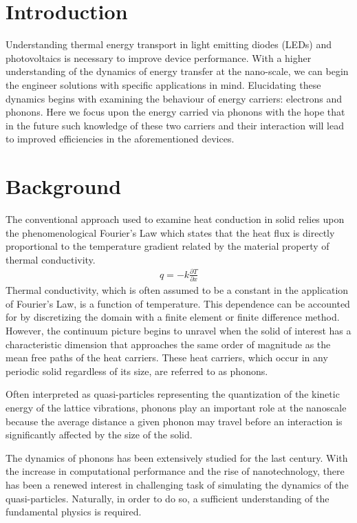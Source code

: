 \documentclass{article}
\numberwithin{equation}{section}
\begin{document}
\section{Introduction}
Understanding thermal energy transport in light emitting diodes (LEDs) and photovoltaics is necessary to improve device performance. With a higher understanding of the dynamics of energy transfer at the nano-scale, we can begin the engineer solutions with specific applications in mind. Elucidating these dynamics begins with examining the behaviour of energy carriers: electrons and phonons. Here we focus upon the energy carried via phonons with the hope that in the future such knowledge of these two carriers and their interaction will lead to improved efficiencies in the aforementioned devices.\\

\section{Background}
The conventional approach used to examine heat conduction in solid relies upon the phenomenological Fourier's Law which states that the heat flux is directly proportional to the temperature gradient related by the material property of thermal conductivity.
\begin{align*}
		q=-k\frac{\partial T}{\partial x}
\end{align*}
Thermal conductivity, which is often assumed to be a constant in the application of Fourier's Law, is a function of temperature. This dependence can be accounted for by discretizing the domain with a finite element or finite difference method. However, the continuum picture begins to unravel when the solid of interest has a characteristic dimension that approaches the same order of magnitude as the mean free paths of the heat carriers. These heat carriers, which occur in any periodic solid regardless of its size, are referred to as phonons.

Often interpreted as quasi-particles representing the quantization of the kinetic energy of the lattice vibrations, phonons play an important role at the nanoscale because the average distance a given phonon may travel before an interaction is significantly affected by the size of the solid.

The dynamics of phonons has been extensively studied for the last century. With the increase in computational performance and the rise of nanotechnology, there has been a renewed interest in challenging task of simulating the dynamics of the quasi-particles. Naturally, in order to do so, a sufficient understanding of the fundamental physics is required.
\end{document}
